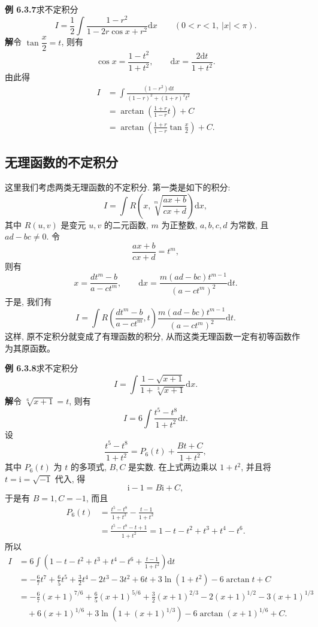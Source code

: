 \documentclass[UTF8,12pt,a4paper,fontset=fandol]{ctexart}
\begin{document}
\noindent\textbf{例 6.3.7}\quad 求不定积分
\[
  I=\frac12\int\frac{1-r^2}{1-2r\cos x+r^2}\mathrm dx
  \qquad(0<r<1,\ |x|<\pi).
\]
\noindent\textbf{解}\quad 令 $\tan\dfrac x2=t$, 则有
\[
  \cos x=\frac{1-t^2}{1+t^2},\qquad
  \mathrm dx=\frac{2\mathrm dt}{1+t^2}.
\]
由此得
\[
\begin{aligned}
  I
  &=
  \int\frac{(1-r^2)\mathrm dt}{(1-r)^2+(1+r)^2t^2}\\
  &=
  \arctan\left(\frac{1+r}{1-r}t\right)+C\\
  &=
  \arctan\left(\frac{1+r}{1-r}\tan\frac x2\right)+C.
\end{aligned}
\]

\subsection{无理函数的不定积分}

这里我们考虑两类无理函数的不定积分. 第一类是如下的积分:
\[
  I=\int R\left(x,\sqrt[m]{\frac{ax+b}{cx+d}}\right)\mathrm dx,
\]
其中 $R(u,v)$ 是变元 $u,v$ 的二元函数, $m$ 为正整数, $a,b,c,d$ 为常数, 且 $ad-bc\ne0$. 令
\[
  \frac{ax+b}{cx+d}=t^m,
\]
则有
\[
  x=\frac{dt^m-b}{a-ct^m},\qquad
  \mathrm dx=\frac{m(ad-bc)t^{m-1}}{(a-ct^m)^2}\mathrm dt.
\]
于是, 我们有
\[
  I=
  \int R\left(\frac{dt^m-b}{a-ct^m},t\right)
  \frac{m(ad-bc)t^{m-1}}{(a-ct^m)^2}\mathrm dt.
\]
这样, 原不定积分就变成了有理函数的积分, 从而这类无理函数一定有初等函数作为其原函数。

\noindent\textbf{例 6.3.8}\quad 求不定积分
\[
  I=\int\frac{1-\sqrt{x+1}}{1+\sqrt[3]{x+1}}\mathrm dx.
\]
\noindent\textbf{解}\quad 令 $\sqrt[6]{x+1}=t$, 则有
\[
  I=6\int\frac{t^5-t^8}{1+t^2}\mathrm dt.
\]
设
\[
  \frac{t^5-t^8}{1+t^2}=P_6(t)+\frac{Bt+C}{1+t^2},
\]
其中 $P_6(t)$ 为 $t$ 的多项式, $B,C$ 是实数. 在上式两边乘以 $1+t^2$, 并且将 $t=\mathrm i=\sqrt{-1}$ 代入, 得
\[
  \mathrm i-1=B\mathrm i+C,
\]
于是有 $B=1,C=-1$, 而且
\[
\begin{aligned}
  P_6(t)
  &=
  \frac{t^5-t^8}{1+t^2}-\frac{t-1}{1+t^2}\\
  &=
  \frac{t^5-t^8-t+1}{1+t^2}
  =
  1-t-t^2+t^3+t^4-t^6.
\end{aligned}
\]
所以
\[
\begin{aligned}
  I
  &=
  6\int\left(1-t-t^2+t^3+t^4-t^6+\frac{t-1}{1+t^2}\right)\mathrm dt\\
  &=
  -\frac67t^7+\frac65t^5+\frac32t^4-2t^3-3t^2+6t
  +3\ln(1+t^2)-6\arctan t+C\\
  &=
  -\frac67(x+1)^{7/6}+\frac65(x+1)^{5/6}
  +\frac32(x+1)^{2/3}-2(x+1)^{1/2}-3(x+1)^{1/3}\\
  &\quad+
  6(x+1)^{1/6}+3\ln\left(1+(x+1)^{1/3}\right)
  -6\arctan(x+1)^{1/6}+C.
\end{aligned}
\]
\end{document}
